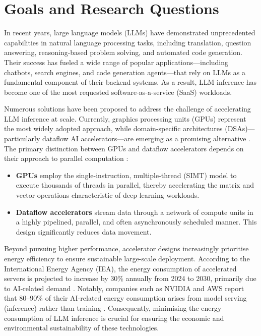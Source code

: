 \section{Goals and Research Questions}
\label{intro:goals}

In recent years, large language models (LLMs) have demonstrated unprecedented capabilities in natural language processing tasks, including translation, question answering, reasoning-based problem solving, and automated code generation.
Their success has fueled a wide range of popular applications—including chatbots, search engines, and code generation agents—that rely on LLMs as a fundamental component of their backend systems. As a result, LLM inference has become one of the most requested software-as-a-service (SaaS) workloads.

Numerous solutions have been proposed to address the challenge of accelerating LLM inference at scale. Currently, graphics processing units (GPUs) represent the most widely adopted approach, while domain-specific architectures (DSAs)—particularly dataflow AI accelerators—are emerging as a promising alternative \cite{chen2020survey, koilia2024hardware, silvano2025survey, kachris2025survey}.
The primary distinction between GPUs and dataflow accelerators depends on their approach to parallel computation \cite{kundu2025comparison}:
\begin{itemize}
    \item \textbf{GPUs} employ the single-instruction, multiple-thread (SIMT) model to execute thousands of threads in parallel, thereby accelerating the matrix and vector operations characteristic of deep learning workloads.
    \item \textbf{Dataflow accelerators} stream data through a network of compute units in a highly pipelined, parallel, and often asynchronously scheduled manner. This design significantly reduces data movement.
\end{itemize}

Beyond pursuing higher performance, accelerator designs increasingly prioritise energy efficiency to ensure sustainable large-scale deployment.
According to the International Energy Agency (IEA), the energy consumption of accelerated servers is projected to increase by 30\% annually from 2024 to 2030, primarily due to AI-related demand \cite{iea2025ai}.
Notably, companies such as NVIDIA and AWS report that 80–90\% of their AI-related energy consumption arises from model serving (inference) rather than training \cite{patterson2021carbon}.
Consequently, minimising the energy consumption of LLM inference is crucial for ensuring the economic and environmental sustainability of these technologies.


